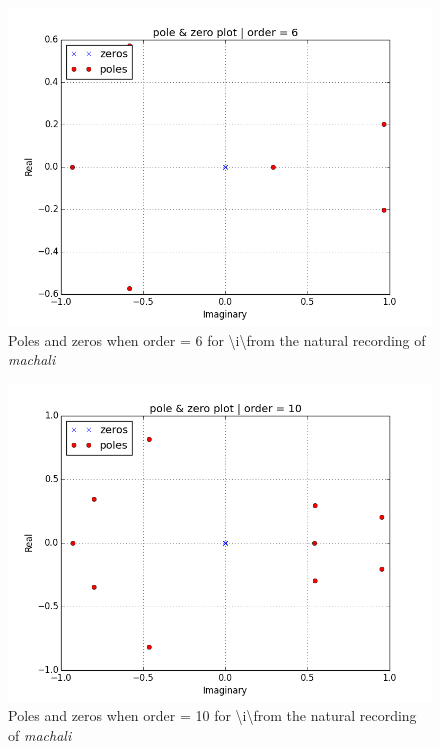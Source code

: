 \documentclass[a4paper]{article}
\begin{document}
\begin{figure}[h!]
    \includegraphics[width=\linewidth]{./images/i_pole-zero_6_.png}
    \caption{Poles and zeros when order = 6 for \textbackslash i\textbackslash from the natural recording of \textit{machali}}
    \label{fig:1}
\end{figure}


\begin{figure}[h!]
    \includegraphics[width=\linewidth]{./images/i_pole-zero_10_.png}
    \caption{ Poles and zeros when order = 10 for \textbackslash i\textbackslash from the natural recording of \textit{machali}}
    \label{fig:1}
\end{figure}
\end{document}
